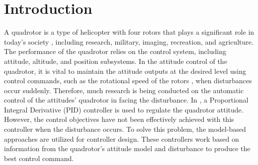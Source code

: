 \documentclass[3p,times]{elsarticle}
\begin{document}
\section{Introduction}\label{sec:intro}
A quadrotor is a type of helicopter with four rotors that plays a significant role in today's society \cite{drones5030059}, including research, military, imaging, recreation, and agriculture. The performance of the quadrotor relies on the control system, including attitude, altitude, and position subsystems. In the attitude control of the quadrotor, it is vital to maintain the attitude outputs at the desired level using control commands, such as the rotational speed of the rotors \cite{article_Sharifi}, when disturbances occur suddenly. Therefore, much research is being conducted on the automatic control of the attitudes' quadrotor in facing the disturbance.
In \cite{article_Bolandi,article_Abdul}, a Proportional Integral Derivative (PID) controller is used to regulate the quadrotor attitude. However, the control objectives have not been effectively achieved with this controller when the disturbance occurs. To solve this problem, the model-based approaches \cite{bouzid:hal-02543214,9275226} are utilized for controller design. These controllers work based on information from the quadrotor's attitude model and disturbance to produce the best control command.
\end{document}
